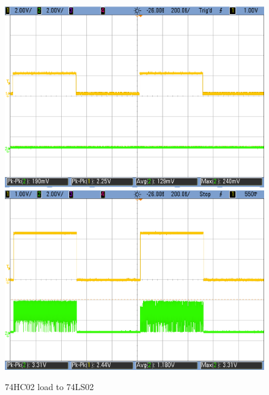 \begin{figure}[h!]
		\vspace{0.2cm}
	   \includegraphics[scale=0.19]{../Exercise2/HC-LS-2V.png}\hspace{1cm} 
        \includegraphics[scale=0.19]{../Exercise2/HC-LS-2p3V.png}
        \caption{\color{cyan}74HC02 load to 74LS02}
        \label{fig:ej2exhctols}
    \end{figure}
    

